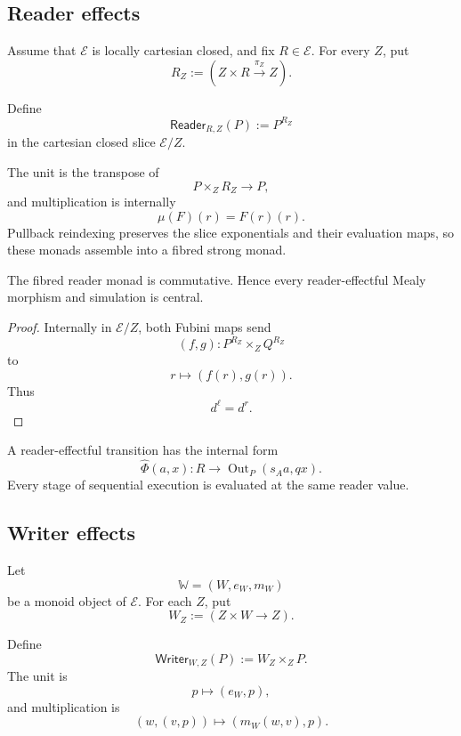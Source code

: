\subsection{Reader effects}
\label{subsec:reader-effects}

Assume that \(\mathcal E\) is locally cartesian closed, and fix
\(R\in\mathcal E\).  For every \(Z\), put
\[
    R_Z
    :=
    (Z\times R\xrightarrow{\pi_Z}Z).
\]

\begin{definition}
\label{def:fibred-reader-monad}
Define
\[
    \mathsf{Reader}_{R,Z}(P)
    :=
    P^{R_Z}
\]
in the cartesian closed slice \(\mathcal E/Z\).
\end{definition}

The unit is the transpose of
\[
    P\times_ZR_Z\to P,
\]
and multiplication is internally
\[
    \mu(F)(r)=F(r)(r).
\]
Pullback reindexing preserves the slice exponentials and their evaluation
maps, so these monads assemble into a fibred strong monad.

\begin{proposition}
\label{prop:reader-effects-central}
The fibred reader monad is commutative.  Hence every reader-effectful Mealy
morphism and simulation is central.
\end{proposition}

\begin{proof}
Internally in \(\mathcal E/Z\), both Fubini maps send
\[
    (f,g):
    P^{R_Z}\times_ZQ^{R_Z}
\]
to
\[
    r\longmapsto(f(r),g(r)).
\]
Thus
\[
    d^\ell=d^r.
\]
\end{proof}

A reader-effectful transition has the internal form
\[
    \widehat\Phi(a,x):
    R\longrightarrow
    \operatorname{Out}_P(s_Aa,qx).
\]
Every stage of sequential execution is evaluated at the same reader value.

\subsection{Writer effects}
\label{subsec:writer-effects}

Let
\[
    \mathbb W=(W,e_W,m_W)
\]
be a monoid object of \(\mathcal E\).  For each \(Z\), put
\[
    W_Z:=(Z\times W\to Z).
\]

\begin{definition}
\label{def:fibred-writer-monad}
Define
\[
    \mathsf{Writer}_{W,Z}(P)
    :=
    W_Z\times_ZP.
\]
The unit is
\[
    p\longmapsto(e_W,p),
\]
and multiplication is
\[
    (w,(v,p))
    \longmapsto
    (m_W(w,v),p).
\]
\end{definition}

